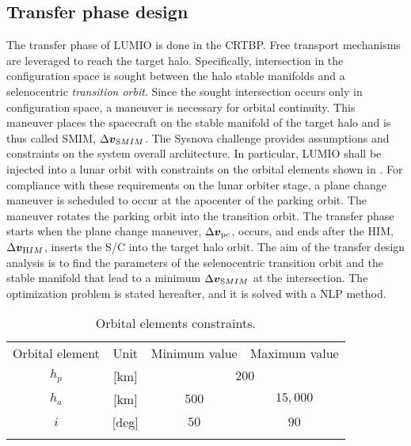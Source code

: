 \subsection{Transfer phase design}\label{subsec:Transfer phase design}
The transfer phase of LUMIO is done in the CRTBP. Free transport mechanisms are leveraged to reach the target halo. Specifically, intersection in the configuration space is sought between the halo stable manifolds and a selenocentric \emph{transition orbit}. Since the sought intersection occurs only in configuration space, a maneuver is necessary for orbital continuity. This maneuver places the spacecraft on the stable manifold of the target halo and is thus called {SMIM}, $\Delta\boldsymbol{v}_{\textrm SMIM}$. The Sysnova challenge provides assumptions and constraints on the system overall architecture. In particular, LUMIO shall be injected into a lunar orbit with constraints on the orbital elements shown in . For compliance with these requirements on the lunar orbiter stage, a plane change maneuver is scheduled to occur at the apocenter of the parking orbit. The maneuver rotates the parking orbit into the transition orbit. The transfer phase starts when the plane change maneuver, $\Delta\boldsymbol{v}_{\textrm pc}$, occurs, and ends after the {HIM}, $\Delta\boldsymbol{v}_{\textrm HIM}$, inserts the {S/C} into the target halo orbit. The aim of the transfer design analysis is to find the parameters of the selenocentric transition orbit and the stable manifold that lead to a minimum $\Delta\boldsymbol{v}_{\textrm SMIM}$ at the intersection. The optimization problem is stated hereafter, and it is solved with a {NLP} method.
%
\begin{table}[b]
	\caption{Orbital elements constraints.}
	\label{tab:OrbitalElementsConstraints}
	\centering
	\begin{tabular}{cccc}
		\TOPlines
		Orbital element & Unit & Minimum value & Maximum value \\
		\MIDline
		$h_p$ & [km] & \multicolumn{2}{c}{$200$} \\
		$h_a$ & [km] & $500$ & $15,000$ \\
		$i$ & [deg] & $50$ & $90$ \\
		\BOTTOMlines
	\end{tabular}
\end{table}
%

